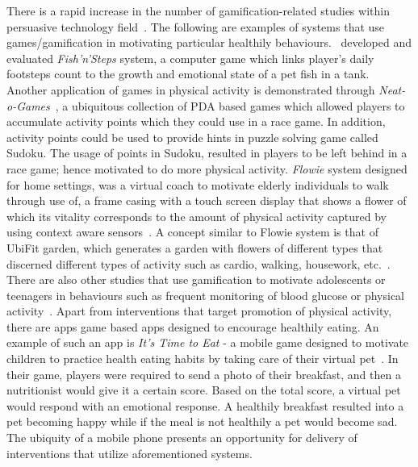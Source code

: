 There is a rapid increase in the number of gamification-related studies within persuasive technology field~\citep{hamari2014persuasive}. The following are examples of systems that use games/gamification in motivating particular healthily  behaviours.~\cite{lin2006:fish} developed and evaluated \emph{{Fish'n'Steps}} system, a computer game which links player's daily footsteps count to the growth and emotional state of a pet fish in a tank. Another application of games in physical activity is demonstrated through \emph{{Neat-o-Games}}~\citep{fujiki2008neat}, a ubiquitous collection of PDA based games which allowed players to accumulate activity points which they could use in a race game. In addition, activity points could be used to provide hints in puzzle solving game called Sudoku. The usage of points in Sudoku, resulted in players to be left behind in a race game; hence motivated to do more physical activity. \emph{Flowie} system designed for home settings, was a virtual coach to motivate elderly individuals to walk through use of, a frame casing with a touch screen display that shows a flower of which its vitality corresponds to the amount of physical activity captured by using context aware sensors~\citep{albaina2009flowie}. A concept similar to Flowie system is that of UbiFit garden, which generates a garden with flowers of different types that discerned different types of activity such as cardio, walking, housework, etc.~\citep{klasnja2009:using}. There are also other studies that use gamification to motivate adolescents or teenagers in behaviours such as frequent monitoring of blood glucose or physical activity~\citep{arteaga2010:persuasive,cafazzo2012:bant}. Apart from interventions that target promotion of physical activity, there are apps game based apps designed to encourage healthily eating. An example of such an app is \emph{It's Time to Eat} - a mobile game designed to motivate children to practice health eating habits by taking care of their virtual pet~\citep{pollak2010s}. In their game, players were required to send a photo of their breakfast, and then a nutritionist would give it a certain score. Based on the total score, a virtual pet would respond with an emotional response. A healthily breakfast resulted into a pet becoming happy while if the meal is not healthily a pet would become sad. The ubiquity of a mobile phone presents an opportunity for delivery of interventions that utilize aforementioned systems. 

